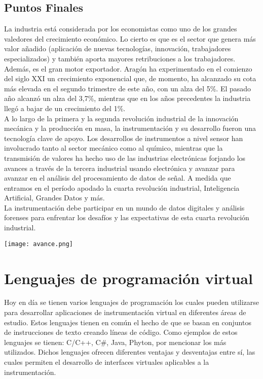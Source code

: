 \documentclass[12pt,letterpaper, onecolumn, titlepage, oneside]{book}
\begin{document}
\subsection{Puntos Finales}
La industria está considerada por los economistas como uno de los grandes valedores del crecimiento económico. Lo cierto es que es el sector que genera más valor añadido (aplicación de nuevas tecnologías, innovación, trabajadores especializados) y también aporta mayores retribuciones a los trabajadores. Además, es el gran motor exportador. Aragón ha experimentado en el comienzo del siglo XXI un crecimiento exponencial que, de momento, ha alcanzado su cota más elevada en el segundo trimestre de este año, con un alza del 5\%. El pasado año alcanzó un alza del 3,7\%, mientras que en los años precedentes la industria llegó a bajar de un crecimiento del 1\%.\\

A lo largo de la primera y la segunda revolución industrial de la innovación mecánica y la producción en masa, la instrumentación y su desarrollo fueron una tecnología clave de apoyo. Los desarrollos de instrumentos a nivel sensor han involucrado tanto al sector mecánico como al químico, mientras que la transmisión de valores ha hecho uso de las industrias electrónicas forjando los avances a través de la tercera industrial usando electrónica y avanzar para avanzar en el análisis del procesamiento de datos de señal. A medida que entramos en el período apodado la cuarta revolución industrial, Inteligencia Artificial, Grandes Datos y más.\\

La instrumentación debe participar en un mundo de datos digitales y análisis forenses para enfrentar los desafíos y las expectativas de esta cuarta revolución industrial.\\

\begin{center}
    \texttt{[image: avance.png]}
\end{center}



\section{Lenguajes de programación virtual}
Hoy en día se tienen varios lenguajes de programación los cuales pueden utilizarse para desarrollar aplicaciones de instrumentación virtual en diferentes áreas de estudio. Estos lenguajes tienen en común el hecho de que se basan en conjuntos de instrucciones de texto creando líneas de código. Como ejemplos de estos lenguajes se tienen: C/C++, C\#, Java, Phyton, por mencionar los más utilizados. Dichos lenguajes ofrecen diferentes ventajas y desventajas entre sí, las cuales
permiten el desarrollo de interfaces virtuales aplicables a la instrumentación.
\end{document}
